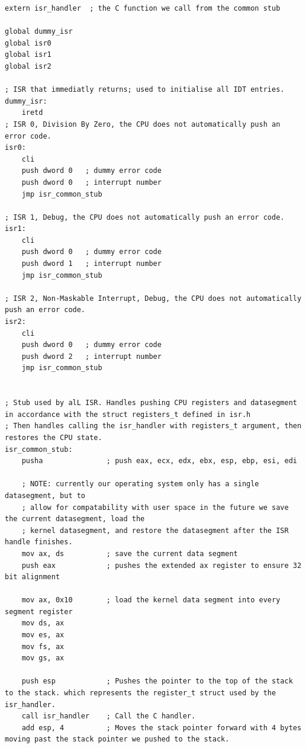 \documentclass[../main.tex]{subfiles}
\begin{document}
\begin{listing}[H]
    \begin{verbatim}
extern isr_handler  ; the C function we call from the common stub

global dummy_isr
global isr0
global isr1
global isr2

; ISR that immediatly returns; used to initialise all IDT entries.
dummy_isr: 
	iretd
; ISR 0, Division By Zero, the CPU does not automatically push an error code.
isr0:
    cli
    push dword 0   ; dummy error code
    push dword 0   ; interrupt number
    jmp isr_common_stub

; ISR 1, Debug, the CPU does not automatically push an error code.
isr1:
    cli
    push dword 0   ; dummy error code
    push dword 1   ; interrupt number
    jmp isr_common_stub

; ISR 2, Non-Maskable Interrupt, Debug, the CPU does not automatically push an error code.
isr2:
    cli
    push dword 0   ; dummy error code
    push dword 2   ; interrupt number
    jmp isr_common_stub


; Stub used by alL ISR. Handles pushing CPU registers and datasegment in accordance with the struct registers_t defined in isr.h
; Then handles calling the isr_handler with registers_t argument, then restores the CPU state.
isr_common_stub:
    pusha               ; push eax, ecx, edx, ebx, esp, ebp, esi, edi

	; NOTE: currently our operating system only has a single datasegment, but to
	; allow for compatability with user space in the future we save the current datasegment, load the
	; kernel datasegment, and restore the datasegment after the ISR handle finishes.
    mov ax, ds          ; save the current data segment
    push eax            ; pushes the extended ax register to ensure 32 bit alignment

    mov ax, 0x10        ; load the kernel data segment into every segment register
    mov ds, ax
    mov es, ax
    mov fs, ax
    mov gs, ax

    push esp            ; Pushes the pointer to the top of the stack to the stack. which represents the register_t struct used by the isr_handler.
    call isr_handler    ; Call the C handler.
    add esp, 4          ; Moves the stack pointer forward with 4 bytes moving past the stack pointer we pushed to the stack.


\end{verbatim}
\end{listing}
\end{document}
